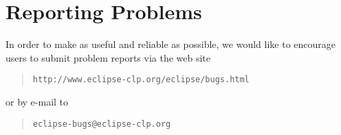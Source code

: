 \section{Reporting Problems}
In order to make {\eclipse} as useful and reliable as possible,
we would like to encourage users to submit problem reports via the web site
\begin{quote}\begin{verbatim}
http://www.eclipse-clp.org/eclipse/bugs.html
\end{verbatim}\end{quote}
or by e-mail to
\begin{quote}\begin{verbatim}
eclipse-bugs@eclipse-clp.org
\end{verbatim}\end{quote}
